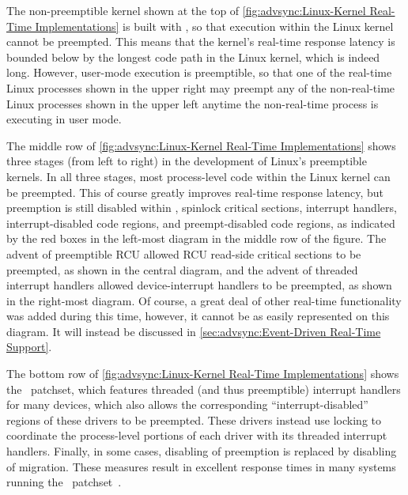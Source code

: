 The non-preemptible kernel shown at the top of
\cref{fig:advsync:Linux-Kernel Real-Time Implementations}
is built with , so that execution within the Linux
kernel cannot be preempted.
This means that the kernel's real-time response latency is bounded below
by the longest code path in the Linux kernel, which is indeed long.
However, user-mode execution is preemptible, so that one of the
real-time Linux processes shown in the upper right may preempt any of the
non-real-time Linux processes shown in the upper left anytime the
non-real-time process is executing in user mode.

The middle row of
\cref{fig:advsync:Linux-Kernel Real-Time Implementations}
shows three stages (from left to right) in the development of Linux's
preemptible kernels.
In all three stages, most process-level code within the Linux kernel
can be preempted.
This of course greatly improves real-time response latency, but
preemption is still disabled
within ,
spinlock critical sections,
interrupt handlers,
interrupt-disabled code regions, and
preempt-disabled code regions, as indicated by the red boxes in the
left-most diagram in the middle row of the figure.
The advent of preemptible RCU allowed RCU read-side critical sections
to be preempted, as shown in the central diagram,
and the advent of threaded interrupt handlers allowed device-interrupt
handlers to be preempted, as shown in the right-most diagram.
Of course, a great deal of other real-time functionality was added
during this time, however, it cannot be as easily represented on this
diagram.
It will instead be discussed in
\cref{sec:advsync:Event-Driven Real-Time Support}.

The bottom row of
\cref{fig:advsync:Linux-Kernel Real-Time Implementations}
shows the \rt\ patchset, which features threaded (and thus preemptible)
interrupt handlers for many devices, which also allows the corresponding
``interrupt-disabled'' regions of these drivers to be preempted.
These drivers instead use locking to coordinate the process-level
portions of each driver with its threaded interrupt handlers.
Finally, in some cases, disabling of preemption is replaced by
disabling of migration.
These measures result in excellent response times in many systems running
the \rt\ patchset~\cite{Reghenzani:2019:RLK:3309872.3297714,DanielBristot2019RTtrace}.

